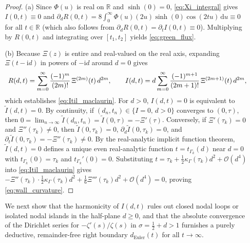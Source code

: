 \documentclass[11pt,a4paper,reqno]{amsart}
\theoremstyle{definition}
\theoremstyle{remark}
\numberwithin{equation}{section}
\newcommand{\dd}{\mathrm{d}}
\newcommand{\ii}{\mathrm{i}}
\newcommand{\fac}{\mathclose{\mathchar"0021}}
\begin{document}
\begin{proof}
(a) Since $\Phi(u)$ is real on $\mathbb{R}$ and $\sinh(0) = 0$, \eqref{eq:Xi_integral} gives $I(0,t) \equiv 0$ and $\partial_d R(0,t) = 8\int_0^\infty \Phi(u)(2u)\sinh(0)\cos(2t u)\,\dd u \equiv 0$ for all $t \in \mathbb{R}$ (which also follows from $\partial_d R(0,t) = \partial_t I(0,t) \equiv 0$). Multiplying by $R(0,t)$ and integrating over $[t_1, t_2]$ yields \eqref{eq:green_flux}.

(b) Because $\Xi(z)$ is entire and real-valued on the real axis, expanding $\Xi(t-\ii d)$ in powers of $-\ii d$ around $d = 0$ gives
\begin{equation}\label{eq:RI_taylor_d}
R(d,t) = \sum_{m=0}^\infty \frac{(-1)^m}{(2m)\fac}\,\Xi^{(2m)}(t)\,d^{2m}, \qquad I(d,t) = d\sum_{m=0}^\infty \frac{(-1)^{m+1}}{(2m+1)\fac}\,\Xi^{(2m+1)}(t)\,d^{2m},
\end{equation}
which establishes \eqref{eq:Itil_maclaurin}. For $d > 0$, $I(d,t) = 0$ is equivalent to $\widetilde{I}(d,t) = 0$. By continuity, if $(d_n, t_n) \in \{I = 0,\, d > 0\}$ converges to $(0, \tau)$, then $0 = \lim_{n\to\infty}\widetilde{I}(d_n, t_n) = \widetilde{I}(0, \tau) = -\Xi'(\tau)$. Conversely, if $\Xi'(\tau_k) = 0$ and $\Xi''(\tau_k) \neq 0$, then $\widetilde{I}(0,\tau_k) = 0$, $\partial_d\widetilde{I}(0,\tau_k) = 0$, and $\partial_t\widetilde{I}(0,\tau_k) = -\Xi''(\tau_k) \neq 0$. By the real-analytic implicit function theorem, $\widetilde{I}(d,t) = 0$ defines a unique even real-analytic function $t = t_{\Gamma_k}(d)$ near $d = 0$ with $t_{\Gamma_k}(0) = \tau_k$ and $t_{\Gamma_k}'(0) = 0$. Substituting $t = \tau_k + \frac{1}{2}\kappa_\Gamma(\tau_k)d^2 + \mathcal{O}(d^4)$ into \eqref{eq:Itil_maclaurin} gives $-\Xi''(\tau_k)\cdot\frac{1}{2}\kappa_\Gamma(\tau_k)d^2 + \frac{1}{6}\Xi'''(\tau_k)d^2 + \mathcal{O}(d^4) = 0$, proving \eqref{eq:wall_curvature}.
\end{proof}

We next show that the harmonicity of $I(d,t)$ rules out closed nodal loops or isolated nodal islands in the half-plane $d \ge 0$, and that the absolute convergence of the Dirichlet series for $-\zeta'(s)/\zeta(s)$ in $\sigma = \frac{1}{2} + d > 1$ furnishes a purely deductive, remainder-free right boundary $d_{\mathrm{Euler}}(t)$ for all $t \to \infty$.
\end{document}
